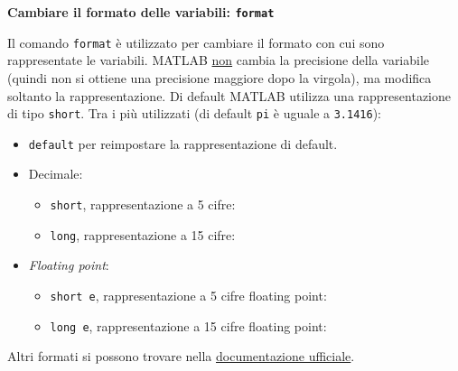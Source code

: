\documentclass[a4paper]{article}
\begin{document}
    \newpage

    \begin{flushleft}
        \large
        \textcolor{Red3}{\textbf{Cambiare il formato delle variabili: \texttt{format}}}
    \end{flushleft}
    Il comando \texttt{format} è utilizzato per cambiare il formato con cui sono rappresentate le variabili. MATLAB \underline{non} cambia la precisione della variabile (quindi non si ottiene una precisione maggiore dopo la virgola), ma modifica soltanto la rappresentazione. Di default MATLAB utilizza una rappresentazione di tipo \texttt{short}. Tra i più utilizzati (di default \texttt{pi} è uguale a \texttt{3.1416}):
    \begin{itemize}
        \item \texttt{default} per reimpostare la rappresentazione di default.

        \item Decimale:
        \begin{itemize}
            \item \texttt{short}, rappresentazione a 5 cifre:
            

            \item \texttt{long}, rappresentazione a 15 cifre:
            
        \end{itemize}

        \item \emph{Floating point}:
        \begin{itemize}
            \item \texttt{short e}, rappresentazione a 5 cifre floating point:
            

            \item \texttt{long e}, rappresentazione a 15 cifre floating point:
            
        \end{itemize}
    \end{itemize}
    Altri formati si possono trovare nella \href{https://uk.mathworks.com/help/releases/R2024a/matlab/ref/format.html#btiwmh5-1-style}{documentazione ufficiale}.

    \newpage
\end{document}

